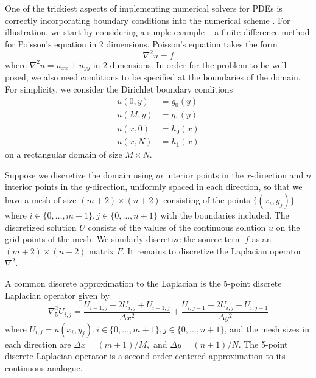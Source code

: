 \documentclass[conference]{IEEEtran}
\begin{document}
One of the trickiest aspects of implementing numerical solvers for PDEs is correctly incorporating boundary conditions into the numerical scheme \cite{pdenotesmixed}. For illustration, we start by considering a simple example -- a finite difference method for Poisson's equation in 2 dimensions. Poisson's equation takes the form
\begin{equation}
  \nabla^2 u = f
\end{equation}
where $\nabla^2 u = u_{xx} + u_{yy}$ in 2 dimensions. In order for the problem to be well posed, we also need conditions to be specified at the boundaries of the domain. For simplicity, we consider the Dirichlet boundary conditions
\begin{align}
  u(0, y) &= g_0(y) \\
  u(M, y) &= g_1(y) \\
  u(x, 0) &= h_0(x) \\
  u(x, N) &= h_1(x)
\end{align}
on a rectangular domain of size $M \times N$.

Suppose we discretize the domain using $m$ interior points in the $x$-direction and $n$ interior points in the $y$-direction, uniformly spaced in each direction, so that we have a mesh of size $(m+2) \times (n+2)$ consisting of the points $\{(x_i, y_j)\}$ where $i \in \{0,\ldots,m+1\}, j \in \{0,\ldots,n+1\}$ with the boundaries included. The discretized solution $U$ consists of the values of the continuous solution $u$ on the grid points of the mesh. We similarly discretize the source term $f$ as an $(m+2) \times (n+2)$ matrix $F$. It remains to discretize the Laplacian operator $\nabla^2$.

A common discrete approximation to the Laplacian is the 5-point discrete Laplacian operator given by \cite{vooren1967ninept,leveque2007fdm}
\begin{equation}
  \nabla_5^2 U_{i,j} = \frac{U_{i-1,j} - 2U_{i,j} + U_{i+1,j}}{\Delta x^2} + \frac{U_{i,j-1} - 2U_{i,j} + U_{i,j+1}}{\Delta y^2}
\end{equation}
where $U_{i,j} = u(x_i, y_j), i \in \{0,\ldots,m+1\}, j \in \{0,\ldots,n+1\}$, and the mesh sizes in each direction are $\Delta x = (m+1)/M,$ and $\Delta y = (n+1)/N$. The 5-point discrete Laplacian operator is a second-order centered approximation to its continuous analogue.
\end{document}
